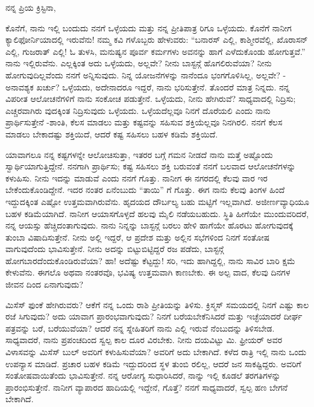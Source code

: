 ನನ್ನ ಪ್ರಿಯ ಕ್ರಿಸ್ಟಿನಾ,

ಕೊನೆಗೆ, ನಾನು ಇಲ್ಲಿ ಬಂದುದು ನನಗೆ ಒಳ್ಳೆಯದು ಮತ್ತು ನನ್ನ ಪ್ರೀತಿಪಾತ್ರ ರಿಗೂ ಒಳ್ಳೆಯದು. ಕೊನೆಗೆ ನಾನೀಗ ಕ್ಯಾಲಿಫೋರ್ನಿಯಾದಲ್ಲಿ ಇರುವೆನು! ನಮ್ಮ ಕವಿ ಗಳೊಬ್ಬರು ಹೇಳುವರು: “ಬನಾರಸ್ ಎಲ್ಲಿ, ಕಾಶ್ಮೀರವೆಲ್ಲಿ, ಖೊರಾಸನ್ ಎಲ್ಲಿ, ಗುಜರಾತ್ ಎಲ್ಲಿ! ಓ ತುಳಸಿ, ಮನುಷ್ಯನ ಪೂರ್ವ ಕರ್ಮಗಳು ಅವನನ್ನು ಹಾಗೆ ಎಳೆದುಕೊಂಡು ಹೋಗುತ್ತವೆ.” ನಾನು ಇಲ್ಲಿರುವೆನು. ಎಲ್ಲಕ್ಕಿಂತ ಅದು ಒಳ್ಳೆಯದು, ಅಲ್ಲವೇ? ನೀನು ಬಾಸ್ಟನ್ಗೆ ಹೊಗಲಿರುವೆಯಾ? ನೀನು ಹೋಗುವುದಿಲ್ಲವೆಂದು ನನಗೆ ಅನ್ನಿಸುವುದು. ನಿನ್ನ ಯೋಜನೆಗಳನ್ನು ನಾನೆಂದೂ ಭಂಗಗೊಳಿಸಿಲ್ಲ, ಅಲ್ಲವೇ? - ಅನಾವಶ್ಯಕ ಖರ್ಚು? ಒಳ್ಳೆಯದು, ಅದೇನಾದರೂ ಇದ್ದರೆ, ನಾನು ಭರಿಸುತ್ತೇನೆ. ತೊಂದರೆ ಮಾತ್ರ ನಿನ್ನದು. ನನ್ನ ವಿಪರೀತ ಆಲೋಚನೆಗಳಿಗೆ ನಾನು ಸಂಕೋಚ ಪಡುತ್ತೇನೆ. ಒಳ್ಳೆಯದು, ನೀನು ಹೇಗಿರುವೆ? ಸಾಧ್ಯವಾದಲ್ಲಿ ನಿದ್ರಿಸು; ಎಚ್ಚರವಾಗಿರು ವುದಕ್ಕಿಂತ ನಿದ್ರಿಸುವುದು ಒಳ್ಳೆಯದು. ಒಳ್ಳೆಯದೆಲ್ಲವೂ ನಿನಗೆ ದೊರೆಯಲಿ ಎಂದು ನಾನು ಪ್ರಾರ್ಥಿಸುತ್ತೇನೆ -ಶಾಂತಿ, ಕೆಲಸ ಮಾಡಲು ಮತ್ತು ಕಷ್ಟವನ್ನು ಸಹಿಸುವ ಶಕ್ತಿಯೆಲ್ಲವೂ ನಿನಗಿರಲಿ. ನನಗೆ ಕೆಲಸ ಮಾಡಲು ಬೇಕಾದಷ್ಟು ಶಕ್ತಿಯಿದೆ, ಆದರೆ ಕಷ್ಟ ಸಹಿಸಲು ಬಹಳ ಕಡಿಮೆ ಶಕ್ತಿಯಿದೆ.

ಯಾವಾಗಲೂ ನನ್ನ ಕಷ್ಟಗಳನ್ನೇ ಆಲೋಚಿಸುತ್ತಾ, ಇತರರ ಬಗ್ಗೆ ಗಮನ ನೀಡದೆ ನಾನು ಮತ್ತೆ ಅಷ್ಟೊಂದು ಸ್ವಾರ್ಥಿಯಾಗುತ್ತಿದ್ದೇನೆ. ನನಗಾಗಿ ಪ್ರಾರ್ಥಿಸು; ಕಷ್ಟ ಸಹಿಸಲು ಶಕ್ತಿ ಬರುವಂತೆ ನನಗೆ ಬಲವಾದ ಆಲೋಚನೆಗಳನ್ನು ಕಳುಹಿಸು. ನೀನು ಇದನ್ನು ಮಾಡುವೆ ಎಂದು ನನಗೆ ಗೊತ್ತು. ನಾನೀಗ ಈ ನಗರದಲ್ಲಿ ಕೆಲವು ವಾರ ಇರ ಬೇಕೆಂದುಕೊಂಡಿದ್ದೇನೆ. ಇದರ ನಂತರ ಏನೆಂಬುದು “ತಾಯಿ” ಗೆ ಗೊತ್ತು. ಈಗ ನಾನು ಕೆಲವು ತಿಂಗಳ ಹಿಂದೆ ಇದ್ದುದಕ್ಕಿಂತ ಎಷ್ಟೋ ಉತ್ತಮವಾಗಿರುವೆನು. ಹೃದಯದ ದೌರ್ಬಲ್ಯ ಬಹು ಮಟ್ಟಿಗೆ ಇಲ್ಲವಾಗಿದೆ. ಅಜೀರ್ಣವ್ಯಾಧಿಯೂ ಬಹಳ ಕಡಿಮೆಯಾಗಿದೆ. ನಾನೀಗ ಆಯಾಸಗೊಳ್ಳದೆ ಹಲವು ಮೈಲಿ ನಡೆಯಬಹುದು. ಸ್ಥಿತಿ ಹೀಗೆಯೇ ಮುಂದುವರಿದರೆ, ನನ್ನ ಆಯಸ್ಸು ಹೆಚ್ಚಿದಂತಾಗುವುದು. ನಾನು ನಿನ್ನನ್ನು ಬಾಸ್ಟನ್ಗೆ ಬರಲು ಹೇಳಿ ಹಾಗೆಯೇ ಹೊರಟು ಹೋಗುವುದಕ್ಕೆ ತುಂಬಾ ವಿಷಾದಿಸುತ್ತೇನೆ. ನೀನು ಅಲ್ಲಿ ಇದ್ದರೆ, ಆ ಪ್ರದೇಶ ಮತ್ತು ಅಲ್ಲಿನ ಸಭೆಗಳಿಂದ ನಿನಗೆ ಸಂತೋಷ ವಾಗುವುದೆಂದು ಭಾವಿಸುತ್ತೇನೆ. ನೀನು ಅದನ್ನು ಬಿಟ್ಟುಬಿಟ್ಟಿದ್ದರೆ ರಜ ಪಡೆದು, ಬಾಸ್ಟನ್ಗೆ ಹೋಗಬಾರದೆಂದುಕೊಂಡಿರುವೆಯಾ? ಹಾ! ಅದೆಷ್ಟು ಕೆಟ್ಟದ್ದು! ಸರಿ, ಇದು ಹಾಗಿದ್ದಲ್ಲಿ, ನಾನು ಸಾವಿರ ಬಾರಿ ಕ್ಷಮೆ ಕೇಳುವೆನು. ಈಗಲೊ ಅಥವಾ ನಂತರವೊ, ಭವಿಷ್ಯ ಉತ್ತಮವಾಗಿ ಕಾಣಬೇಕು. ಈ ಅಲ್ಪ ವಾದ, ಕೆಲವು ದಿನಗಳ ಜೀವನ ದಿಂದ ಏನಾಗುವುದು?

ಮಿಸೆಸ್ ಫುಂಕೆ ಹೇಗಿರುವರು? ಆಕೆಗೆ ನನ್ನ ಒಂದು ರಾಶಿ ಪ್ರೀತಿಯನ್ನು ತಿಳಿಸು. ಕ್ರಿಸ್ಮಸ್ ಸಮಯದಲ್ಲಿ ನಿನಗೆ ಎಷ್ಟು ಕಾಲ ರಜೆ ಸಿಗುವುದು? ಅದು ಯಾವಾಗ ಪ್ರಾರಂಭವಾಗುವುದು? ನಿನಗೆ ಬರೆಯಬೇಕೆನಿಸಿದರೆ ಮತ್ತು ಇಚ್ಛೆಯಾದರೆ ದೀರ್ಘ ಪತ್ರವನ್ನು ಬರೆ, ಬರೆಯುವೆಯಾ? ಆದರೆ ನನ್ನ ಸ್ನೇಹಿತರಿಗೆ ನಾನು ಎಲ್ಲಿ ಇರುವೆ ನೆಂಬುದನ್ನು ತಿಳಿಸಬೇಡ. ಸಾಧ್ಯವಾದರೆ, ನಾನು ಪ್ರಪಂಚದಿಂದ ಸ್ವಲ್ಪ ಕಾಲ ದೂರ ವಿರಬೇಕು. ನೀನು ದಯವಿಟ್ಟು ಮಿ. ಫ್ರೀಯರ್ ಅವರ ವಿಳಾಸವನ್ನು ಮಿಸೆಸ್ ಬುಲ್ ಅವರಿಗೆ ಕಳುಹಿಸುವೆಯಾ? ಅವರಿಗೆ ಅದು ಬೇಕಾಗಿದೆ. ಕಳೆದ ರಾತ್ರಿ ಇಲ್ಲಿ ನಾನು ಒಂದು ಉಪನ್ಯಾಸ ಮಾಡಿದೆ. ಪ್ರಚಾರ ಬಹಳ ಕಡಿಮೆ ಇದ್ದುದರಿಂದ ಸ್ಥಳ ತುಂಬಿ ರಲಿಲ್ಲ, ಆದರೆ ಜನ ಸಾಕಷ್ಟಿದ್ದರು. ಅವರಿಗೆ ಸಂತೋಷವಾಯಿತೆಂದು ಭಾವಿಸುತ್ತೇನೆ. ನನ್ನ ಆರೋಗ್ಯ ಸುಧಾರಿಸಿದರೆ, ನಾನ್ನು ಇಲ್ಲಿ ಕೂಡಲೆ ತರಗತಿಗಳನ್ನು ಪ್ರಾರಂಭಿಸುತ್ತೇನೆ. ನಾನೀಗ ವ್ಯಾಪಾರದ ಹಾದಿಯಲ್ಲಿ ಇದ್ದೇನೆ, ಗೊತ್ತೆ? ನನಗೆ ಸಾಧ್ಯವಾದರೆ, ಸ್ವಲ್ಪ ಹಣ ಬೇಗನೆ ಬೇಕಾಗಿದೆ.

